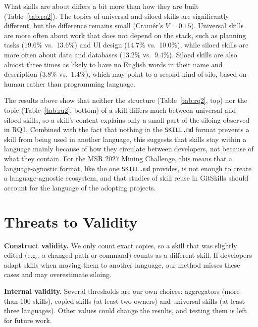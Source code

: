 What skills are about differs a bit more than how they are built (Table~\ref{tab:rq2}). The topics of universal and siloed skills are significantly different, but the difference remains small (Cram\'er's $V = 0.15$). Universal skills are more often about work that does not depend on the stack, such as planning tasks (19.6\% vs.\ 13.6\%) and UI design (14.7\% vs.\ 10.0\%), while siloed skills are more often about data and databases (13.2\% vs.\ 9.4\%). Siloed skills are also almost three times as likely to have no English words in their name and description (3.8\% vs.\ 1.4\%), which may point to a second kind of silo, based on human rather than programming language.

The results above show that neither the structure (Table~\ref{tab:rq2}, top) nor the topic (Table~\ref{tab:rq2}, bottom) of a skill differs much between universal and siloed skills, so a skill's content explains only a small part of the siloing observed in RQ1. Combined with the fact that nothing in the \texttt{SKILL.md} format prevents a skill from being used in another language, this suggests that skills stay within a language mainly because of how they circulate between developers, not because of what they contain. For the MSR 2027 Mining Challenge, this means that a language-agnostic format, like the one \texttt{SKILL.md} provides, is not enough to create a language-agnostic ecosystem, and that studies of skill reuse in GitSkills should account for the language of the adopting projects.

\section{Threats to Validity}
\textbf{Construct validity.} We only count exact copies, so a skill that was slightly edited (e.g., a changed path or command) counts as a different skill. If developers adapt skills when moving them to another language, our method misses these cases and may overestimate siloing.

\textbf{Internal validity.} Several thresholds are our own choices: aggregators (more than 100 skills), copied skills (at least two owners) and universal skills (at least three languages). Other values could change the results, and testing them is left for future work.

